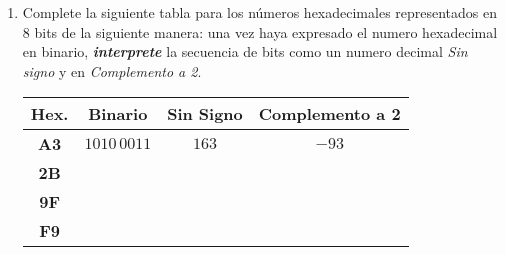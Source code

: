 \documentclass[12pt]{article}
\begin{document}
\begin{enumerate}
\begin{center}
        \end{center}

    \pagebreak %
    \item Complete la siguiente tabla para los números hexadecimales
        representados en 8 bits de la siguiente manera: una vez haya expresado el
        	numero hexadecimal en binario, \textbf{\textit{interprete}} la secuencia 
        	de bits como un numero decimal \emph{Sin signo} y en \emph{Complemento a 2}.

        \begin{center}
            \begin{tabular}[t]{|c|c|c|c|}

            \hline

            \textbf{Hex.} & \textbf{Binario} & \textbf{Sin Signo} & \textbf{Complemento a 2}\\

            \hline

            \textbf{A3} & $1010\,0011$ & $163$ & $-93$\\

            \hline

            \textbf{2B} & \hspace{9em}~ &~&~\\

            \hline

            \textbf{9F}&&&\\

            \hline

            \textbf{F9}&&&\\

            \hline

            \end{tabular}

        \end{center}

\end{enumerate}
\end{document}
